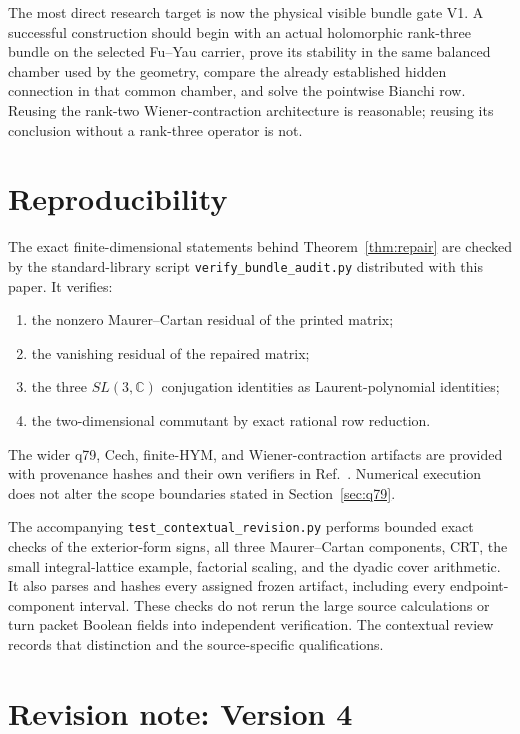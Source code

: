 \documentclass[11pt]{article}
\newcommand{\C}{\mathbb{C}}
\theoremstyle{definition}
\theoremstyle{remark}
\begin{document}
The most direct research target is now the physical visible bundle gate V1.
A successful construction should begin with an actual holomorphic
rank-three bundle on the selected Fu--Yau carrier, prove its stability in the
same balanced chamber used by the geometry, compare the already established
hidden connection in that common chamber, and solve the pointwise Bianchi
row. Reusing the rank-two Wiener-contraction architecture is
reasonable; reusing its conclusion without a rank-three operator is not.

\section{Reproducibility}

The exact finite-dimensional statements behind
Theorem~\ref{thm:repair} are checked by the standard-library script
\texttt{verify\_bundle\_audit.py} distributed with this paper.  It verifies:
\begin{enumerate}[leftmargin=1.6em]
\item the nonzero Maurer--Cartan residual of the printed matrix;
\item the vanishing residual of the repaired matrix;
\item the three \(SL(3,\C)\) conjugation identities as Laurent-polynomial
      identities;
\item the two-dimensional commutant by exact rational row reduction.
\end{enumerate}
The wider q79, Cech, finite-HYM, and Wiener-contraction artifacts are provided
with provenance hashes and their own verifiers in
Ref.~\cite{MTTResultsRepro}.  Numerical execution does not alter the scope
boundaries stated in Section~\ref{sec:q79}.

The accompanying \texttt{test\_contextual\_revision.py} performs bounded
exact checks of the exterior-form signs, all three Maurer--Cartan
components, CRT, the small integral-lattice example, factorial scaling,
and the dyadic cover arithmetic. It also parses and hashes every assigned
frozen artifact, including every endpoint-component interval. These checks
do not rerun the large source calculations or turn packet Boolean fields
into independent verification. The contextual review records that
distinction and the source-specific qualifications.

\section*{Revision note: Version 4}
\end{document}
